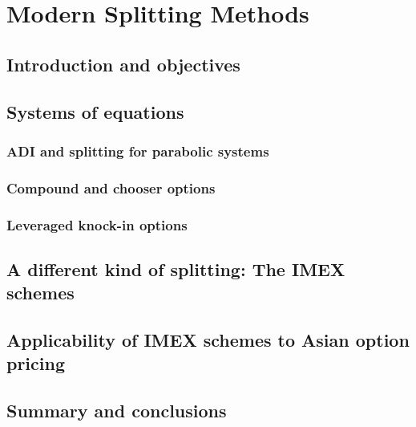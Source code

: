\chapter{Modern Splitting Methods}

\section{Introduction and objectives}

\section{Systems of equations}

\subsection{ADI and splitting for parabolic systems}

\subsection{Compound and chooser options}

\subsection{Leveraged knock-in options}

\section{A different kind of splitting: The IMEX schemes}

\section{Applicability of IMEX schemes to Asian option pricing}

\section{Summary and conclusions}